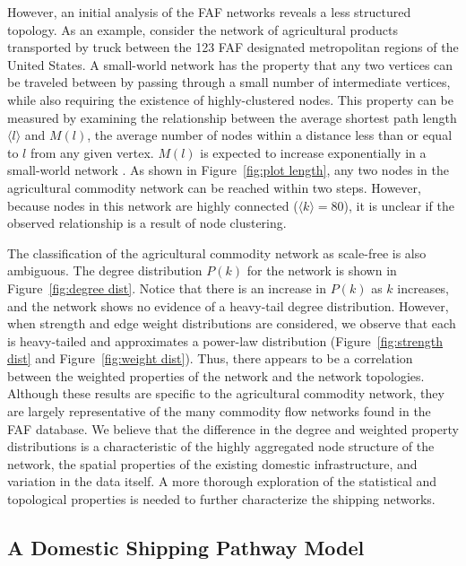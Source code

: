 \documentclass[12pt]{article}
\begin{document}
However, an initial analysis of the FAF networks reveals a less structured topology.  As an example, consider the network of agricultural products transported by truck between the 123 FAF designated metropolitan regions of the United States.  A small-world network has the property that any two vertices can be traveled between by passing through a small number of intermediate vertices, while also requiring the existence of highly-clustered nodes.  This property can be measured by examining the relationship between the average shortest path length $\big \langle l \big \rangle$ and $M(l)$, the average number of nodes within a distance less than or equal to $l$ from any given vertex.  $M(l)$ is expected to increase exponentially in a small-world network \citep{Barrat2008}.  As shown in Figure~\ref{fig:plot length}, any two nodes in the agricultural commodity network can be reached within two steps.  However, because nodes in this network are highly connected ($\big \langle k \big \rangle = 80$), it is unclear if the observed relationship is a result of node clustering.  

The classification of the agricultural commodity network as scale-free is also ambiguous.  The degree distribution $P(k)$ for the network is shown in Figure~\ref{fig:degree dist}.  Notice that there is an increase in $P(k)$ as $k$ increases, and the network shows no evidence of a heavy-tail degree distribution.  However, when strength and edge weight distributions are considered, we observe that each is heavy-tailed and approximates a power-law distribution (Figure~\ref{fig:strength dist} and Figure~\ref{fig:weight dist}).  Thus, there appears to be a correlation between the weighted properties of the network and the network topologies.  Although these results are specific to the agricultural commodity network, they are largely representative of the many commodity flow networks found in the FAF database.  We believe that the difference in the degree and weighted property distributions is a characteristic of the highly aggregated node structure of the network, the spatial properties of the existing domestic infrastructure, and variation in the data itself. A more thorough exploration of the statistical and topological properties is needed to further characterize the shipping networks.

\subsection*{A Domestic Shipping Pathway Model}
\end{document}
